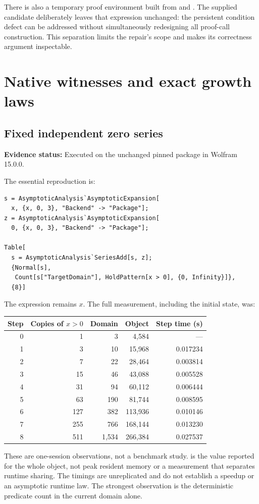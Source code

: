 \documentclass[11pt,a4paper]{article}
\newcommand{\code}[1]{\texttt{\detokenize{#1}}}
\newcommand{\status}[1]{\textbf{Evidence status:} #1.}
\begin{document}
There is also a temporary proof environment built from \code{seriesAss[a]} and \code{seriesAss[b]}. The supplied candidate deliberately leaves that expression unchanged: the persistent condition defect can be addressed without simultaneously redesigning all proof-call construction. This separation limits the repair's scope and makes its correctness argument inspectable.

\section{Native witnesses and exact growth laws}
\label{sec:witness}

\subsection{Fixed independent zero series}
\status{Executed on the unchanged pinned package in Wolfram 15.0.0}

The essential reproduction is:
\begin{lstlisting}
s = AsymptoticAnalysis`AsymptoticExpansion[
  x, {x, 0, 3}, "Backend" -> "Package"];
z = AsymptoticAnalysis`AsymptoticExpansion[
  0, {x, 0, 3}, "Backend" -> "Package"];

Table[
  s = AsymptoticAnalysis`SeriesAdd[s, z];
  {Normal[s],
   Count[s["TargetDomain"], HoldPattern[x > 0], {0, Infinity}]},
  {8}]
\end{lstlisting}
The expression remains $x$. The full measurement, including the initial state, was:
\begin{center}
\begin{tabular}{@{}rrrrr@{}}\toprule
Step & Copies of $x>0$ & Domain \code{LeafCount} & Object \code{ByteCount} & Step time (s)\\\midrule
0 & 1 & 3 & 4,584 & ---\\
1 & 3 & 10 & 15,968 & 0.017234\\
2 & 7 & 22 & 28,464 & 0.003814\\
3 & 15 & 46 & 43,088 & 0.005528\\
4 & 31 & 94 & 60,112 & 0.006444\\
5 & 63 & 190 & 81,744 & 0.008595\\
6 & 127 & 382 & 113,936 & 0.010146\\
7 & 255 & 766 & 168,144 & 0.013230\\
8 & 511 & 1,534 & 266,384 & 0.027537\\\bottomrule
\end{tabular}
\end{center}
These are one-session observations, not a benchmark study. \code{ByteCount} is the value reported for the whole object, not peak resident memory or a measurement that separates runtime sharing. The timings are unreplicated and do not establish a speedup or an asymptotic runtime law. The strongest observation is the deterministic predicate count in the current domain alone.
\end{document}
